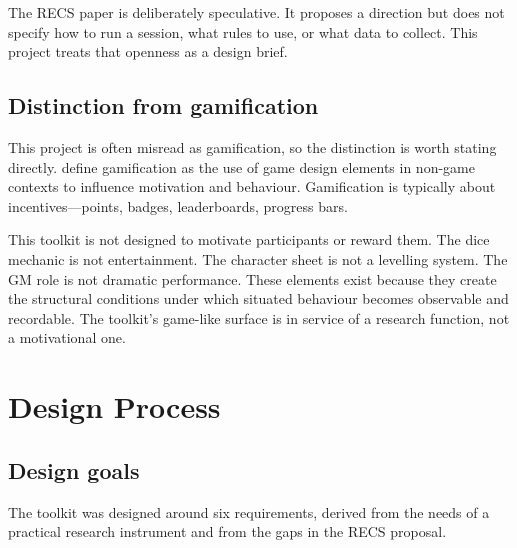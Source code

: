 \documentclass[12pt,a4paper]{report}
\begin{document}
The RECS paper is deliberately speculative.
It proposes a direction but does not specify how to run a session, what rules to use,
or what data to collect.
This project treats that openness as a design brief.

\section{Distinction from gamification}

This project is often misread as gamification, so the distinction is worth stating
directly.
\citet{deterding2011gamification} define gamification as the use of game design
elements in non-game contexts to influence motivation and behaviour.
Gamification is typically about incentives---points, badges, leaderboards, progress bars.

This toolkit is not designed to motivate participants or reward them.
The dice mechanic is not entertainment.
The character sheet is not a levelling system.
The GM role is not dramatic performance.
These elements exist because they create the structural conditions under which situated
behaviour becomes observable and recordable.
The toolkit's game-like surface is in service of a research function, not a motivational
one.

\chapter{Design Process}

\section{Design goals}

The toolkit was designed around six requirements, derived from the needs of a practical
research instrument and from the gaps in the RECS proposal.
\end{document}
